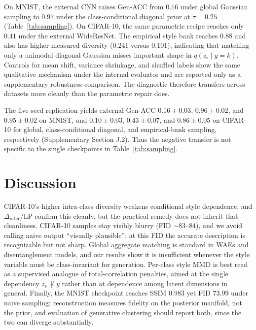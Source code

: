 \documentclass[letterpaper]{article} %
\newcommand{\zs}{z_{\mathrm{s}}}
\newcommand{\Dinter}{\Delta_{\mathrm{inter}}}
\begin{document}
On MNIST, the external CNN raises Gen-ACC from $0.16$ under global Gaussian
sampling to $0.97$ under the class-conditional diagonal prior at
$\tau{=}0.25$ (Table~\ref{tab:sampling}). On CIFAR-10, the same parametric
recipe reaches only $0.41$ under the external WideResNet. The empirical
style bank reaches $0.88$ and also has higher measured diversity ($0.241$
versus $0.101$), indicating that matching only a unimodal diagonal Gaussian
misses important shape in $q(\zs\mid y{=}k)$. Controls for mean shift,
variance shrinkage, and shuffled labels show the same qualitative mechanism
under the internal evaluator and are reported only as a supplementary
robustness comparison. The diagnostic therefore transfers across datasets
more cleanly than the parametric repair does.

The five-seed replication yields external Gen-ACC
$0.16\pm0.03$, $0.96\pm0.02$, and $0.95\pm0.02$ on MNIST, and
$0.10\pm0.03$, $0.43\pm0.07$, and $0.86\pm0.05$ on CIFAR-10 for global,
class-conditional diagonal, and empirical-bank sampling, respectively
(Supplementary Section J.2). Thus the negative transfer is not specific to
the single checkpoints in Table~\ref{tab:sampling}.

\section{Discussion}

CIFAR-10's higher intra-class diversity weakens conditional style dependence,
and $\Dinter$/LP confirm this cleanly, but the practical remedy does not
inherit that cleanliness. CIFAR-10 samples stay visibly blurry (FID
$\sim83$--$84$), and we avoid calling naive output ``visually plausible''; at
this FID the accurate description is recognizable but not sharp. Global
aggregate matching is standard in WAEs and disentanglement models, and our
results show it is insufficient whenever the style variable must be
class-invariant for generation. Per-class style MMD is best read as a
supervised analogue of total-correlation penalties, aimed at the single
dependency $\zs\not\perp y$ rather than at dependence among latent dimensions
in general. Finally, the MNIST checkpoint reaches SSIM $0.983$ yet FID
$73.99$ under naive sampling: reconstruction measures fidelity on the
posterior manifold, not the prior, and evaluation of generative clustering
should report both, since the two can diverge substantially.
\end{document}
